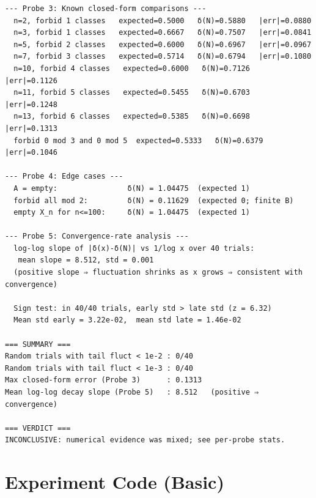 \documentclass[11pt]{article}
\begin{document}
\begin{lstlisting}
--- Probe 3: Known closed-form comparisons ---
  n=2, forbid 1 classes   expected=0.5000   δ(N)=0.5880   |err|=0.0880
  n=3, forbid 1 classes   expected=0.6667   δ(N)=0.7507   |err|=0.0841
  n=5, forbid 2 classes   expected=0.6000   δ(N)=0.6967   |err|=0.0967
  n=7, forbid 3 classes   expected=0.5714   δ(N)=0.6794   |err|=0.1080
  n=10, forbid 4 classes   expected=0.6000   δ(N)=0.7126   |err|=0.1126
  n=11, forbid 5 classes   expected=0.5455   δ(N)=0.6703   |err|=0.1248
  n=13, forbid 6 classes   expected=0.5385   δ(N)=0.6698   |err|=0.1313
  forbid 0 mod 3 and 0 mod 5  expected=0.5333   δ(N)=0.6379   |err|=0.1046

--- Probe 4: Edge cases ---
  A = empty:                δ(N) = 1.04475  (expected 1)
  forbid all mod 2:         δ(N) = 0.11629  (expected 0; finite B)
  empty X_n for n<=100:     δ(N) = 1.04475  (expected 1)

--- Probe 5: Convergence-rate analysis ---
  log-log slope of |δ(x)-δ(N)| vs 1/log x over 40 trials:
   mean slope = 8.512, std = 0.001
  (positive slope ⇒ fluctuation shrinks as x grows ⇒ consistent with convergence)

  Sign test: in 40/40 trials, early std > late std (z = 6.32)
  Mean std early = 3.22e-02,  mean std late = 1.46e-02

=== SUMMARY ===
Random trials with tail fluct < 1e-2 : 0/40
Random trials with tail fluct < 1e-3 : 0/40
Max closed-form error (Probe 3)      : 0.1313
Mean log-log decay slope (Probe 5)   : 8.512   (positive ⇒ convergence)

=== VERDICT ===
INCONCLUSIVE: numerical evidence was mixed; see per-probe stats.

\end{lstlisting}


\section{Experiment Code (Basic)}
\end{document}
